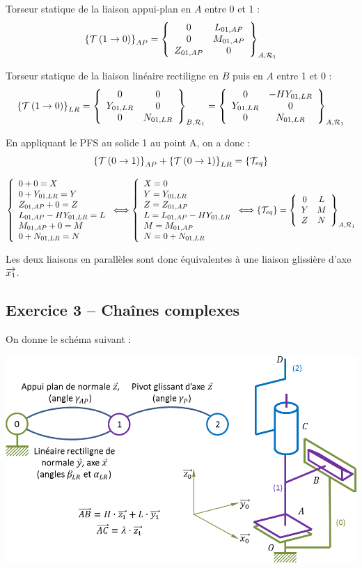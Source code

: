 \documentclass[10pt]{article}
\begin{document}
{\begin{corrige}
\noindent\colorbox{grisf}{}

Torseur statique de la liaison appui-plan en $A$ entre 0 et 1 :
$$
\torseurstat{T}{1}{0}_{AP}=
\torseurcol{0}{0}{Z_{01,AP}}{L_{01,AP}}{M_{01,AP}}{0}{A,\mathcal{R}_1}
$$

Torseur statique de la liaison linéaire rectiligne en $B$ puis en $A$ entre 1 et 0 :
$$
\torseurstat{T}{1}{0}_{LR}=
\torseurcol{0}{Y_{01,LR}}{0}{0}{0}{N_{01,LR}}{B,\mathcal{R}_1}
=
\torseurcol{0}{Y_{01,LR}}{0}{-HY_{01,LR}}{0}{N_{01,LR}}{A,\mathcal{R}_1}
$$


En appliquant le PFS au solide 1 au point A, on a donc :
$$
\torseurstat{T}{0}{1}_{AP}+\torseurstat{T}{0}{1}_{LR}=\{\mathcal{T}_{eq}\}
$$

$$
\left\{
\begin{array}{l}
0+0 = X \\
0+Y_{01,LR}=Y\\
Z_{01,AP}+0=Z\\
L_{01,AP}-HY_{01,LR}=L\\
M_{01,AP}+0=M\\
0+N_{01,LR}=N
\end{array}
\right.
\Longleftrightarrow
\left\{
\begin{array}{l}
X = 0 \\
Y=Y_{01,LR}\\
Z=Z_{01,AP}\\
L=L_{01,AP}-HY_{01,LR}\\
M=M_{01,AP}\\
N=0+N_{01,LR}
\end{array}
\right.
\Longleftrightarrow
\{\mathcal{T}_{eq}\} =
\torseurcol{0}{Y}{Z}{L}{M}{N}{A,\mathcal{R}_1}
$$

Les deux liaisons en parallèles sont donc équivalentes à une liaison glissière d'axe $\vect{x_1}$.

\end{corrige}
}



\subsection*{Exercice 3 -- Chaînes complexes}

On donne le schéma suivant : 

\begin{center}
\includegraphics[width=.7\textwidth]{images/cc}
\end{center}
\end{document}
